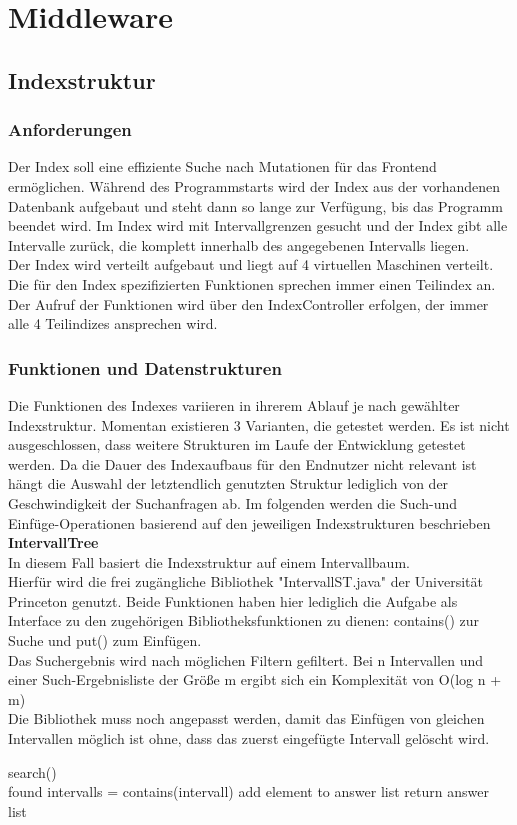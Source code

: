\documentclass{scrartcl}
\begin{document}
\newpage

\section{Middleware}
\subsection{Indexstruktur}

\subsubsection{Anforderungen}
Der Index soll eine effiziente Suche nach Mutationen für das Frontend ermöglichen. Während des Programmstarts wird der Index aus der vorhandenen Datenbank aufgebaut und steht dann so lange zur Verfügung, bis das Programm beendet wird.
Im Index wird mit Intervallgrenzen gesucht und der Index gibt alle Intervalle zurück, die komplett innerhalb des angegebenen Intervalls liegen.\\
Der Index wird verteilt aufgebaut und liegt auf 4 virtuellen Maschinen verteilt. Die für den Index spezifizierten Funktionen sprechen immer einen Teilindex an. Der Aufruf der Funktionen wird über den IndexController erfolgen, der immer alle 4 Teilindizes ansprechen wird.
\subsubsection{Funktionen und Datenstrukturen}
Die Funktionen des Indexes variieren in ihrerem Ablauf je nach gewählter Indexstruktur. Momentan existieren 3 Varianten, die getestet werden. Es ist nicht ausgeschlossen, dass weitere Strukturen im Laufe der Entwicklung getestet werden. Da die Dauer des Indexaufbaus für den Endnutzer nicht relevant ist hängt die Auswahl der letztendlich genutzten Struktur lediglich von der Geschwindigkeit der Suchanfragen ab.
Im folgenden werden die Such-und Einfüge-Operationen basierend auf den jeweiligen Indexstrukturen beschrieben
\newpage
\hfill\\
\textbf{IntervallTree}\\
In diesem Fall basiert die Indexstruktur auf einem Intervallbaum.\\
Hierfür wird die frei zugängliche Bibliothek "IntervallST.java" der Universität Princeton genutzt. Beide Funktionen haben hier lediglich die Aufgabe als Interface zu den zugehörigen Bibliotheksfunktionen zu dienen: contains() zur Suche und put() zum Einfügen.\\
Das Suchergebnis wird nach möglichen Filtern gefiltert. Bei n Intervallen und einer Such-Ergebnisliste der Größe m ergibt sich ein Komplexität von O(log n + m)\\ Die Bibliothek muss noch angepasst werden, damit das Einfügen von gleichen Intervallen möglich ist ohne, dass das zuerst eingefügte Intervall gelöscht wird.
\begin{algorithm}
search()\\{
found intervalls = contains(intervall)\;
{
{
{add element to answer list\;}
}
return answer list\;
}
}
\end{algorithm}
\end{document}
